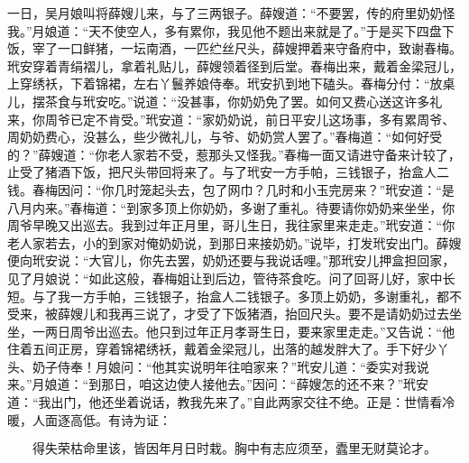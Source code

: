 一日，吴月娘叫将薛嫂儿来，与了三两银子。薛嫂道：“不要罢，传的府里奶奶怪我。”月娘道：“天不使空人，多有累你，我见他不题出来就是了。”于是买下四盘下饭，宰了一口鲜猪，一坛南酒，一匹纻丝尺头，薛嫂押着来守备府中，致谢春梅。玳安穿着青绢褶儿，拿着礼贴儿，薛嫂领着径到后堂。春梅出来，戴着金梁冠儿，上穿绣袄，下着锦裙，左右丫鬟养娘侍奉。玳安扒到地下磕头。春梅分付：“放桌儿，摆茶食与玳安吃。”说道：“没甚事，你奶奶免了罢。如何又费心送这许多礼来，你周爷已定不肯受。”玳安道：“家奶奶说，前日平安儿这场事，多有累周爷、周奶奶费心，没甚么，些少微礼儿，与爷、奶奶赏人罢了。”春梅道：“如何好受的？”薛嫂道：“你老人家若不受，惹那头又怪我。”春梅一面又请进守备来计较了，止受了猪酒下饭，把尺头带回将来了。与了玳安一方手帕，三钱银子，抬盒人二钱。春梅因问：“你几时笼起头去，包了网巾？几时和小玉完房来？”玳安道：“是八月内来。”春梅道：“到家多顶上你奶奶，多谢了重礼。待要请你奶奶来坐坐，你周爷早晚又出巡去。我到过年正月里，哥儿生日，我往家里来走走。”玳安道：“你老人家若去，小的到家对俺奶奶说，到那日来接奶奶。”说毕，打发玳安出门。薛嫂便向玳安说：“大官儿，你先去罢，奶奶还要与我说话哩。”那玳安儿押盒担回家，见了月娘说：“如此这般，春梅姐让到后边，管待茶食吃。问了回哥儿好，家中长短。与了我一方手帕，三钱银子，抬盒人二钱银子。多顶上奶奶，多谢重礼，都不受来，被薛嫂儿和我再三说了，才受了下饭猪酒，抬回尺头。要不是请奶奶过去坐坐，一两日周爷出巡去。他只到过年正月孝哥生日，要来家里走走。”又告说：“他住着五间正房，穿着锦裙绣袄，戴着金梁冠儿，出落的越发胖大了。手下好少丫头、奶子侍奉！月娘问：“他其实说明年往咱家来？”玳安儿道：“委实对我说来。”月娘道：“到那日，咱这边使人接他去。”因问：“薛嫂怎的还不来？”玳安道：“我出门，他还坐着说话，教我先来了。”自此两家交往不绝。正是：世情看冷暖，人面逐高低。有诗为证：

\[
得失荣枯命里该，皆因年月日时栽。
胸中有志应须至，蠹里无财莫论才。
\]
